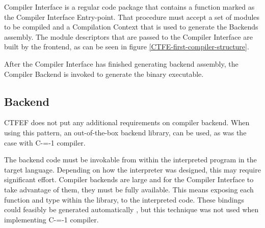 Compiler Interface is a regular code package that contains a function marked as the Compiler Interface Entry-point.
That procedure must accept a set of modules to be compiled and a Compilation Context that is used to generate the Backends assembly.
The module descriptors that are passed to the Compiler Interface are built by the frontend, as can be seen in figure \ref{CTFE-first-compiler-structure}.

After the Compiler Interface has finished generating backend assembly, the Compiler Backend is invoked to generate the binary executable.
\subsection{Backend}
\label{backend}

CTFEF does not put any additional requirements on compiler backend.
When using this pattern, an out-of-the-box backend library, can be used, as was the case with C-=-1 compiler.

The backend code must be invokable from within the interpreted program in the target language.
Depending on how the interpreter was designed, this may require significant effort. %
Compiler backends are large and for the Compiler Interface to take advantage of them, they must be fully available.
This means exposing each function and type within the library, to the interpreted code.
These bindings could feasibly be generated automatically \cite{marshalling_auto_generation}, but this technique was not used when implementing C-=-1 compiler.
